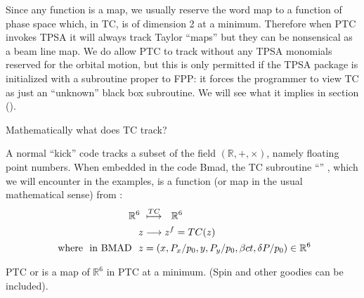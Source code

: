 \documentclass{hitec}     %
\begin{document}
Since any function is a map, we usually reserve the word map to a function of phase space which, in TC, is of dimension 2 at a minimum. Therefore when PTC invokes TPSA it will always track Taylor ``maps'' but they can be nonsensical as a beam line map. We do  allow PTC  to track without any TPSA monomials reserved for the orbital motion, but this is only  permitted if the TPSA package is initialized with a subroutine proper to FPP: it forces the programmer to view TC as  just  an ``unknown'' black box subroutine. We will see what it implies  in section ().


Mathematically what does TC track?

A normal ``kick'' code tracks a subset of the field $(\mathbb{R},+,\times)$, namely floating point numbers. When embedded in the code Bmad, the TC subroutine ``'' , which we will encounter in the examples, is a function (or map in the usual mathematical sense) from :
%
\begin{align} {{\mathbb{R}}}^{6}\ &\stackrel{TC}{\longmapsto}\ \ {{\mathbb{R}}}^{6} \\  z &\longrightarrow {z}^{f}=TC(z) \\~{\rm w}{\rm h}{\rm e}{\rm r}{\rm e}~~{\rm i}{\rm n}~{\rm B}{\rm M}{\rm A}{\rm D}~~z&=
\left({x,{P}_{x}/{p}_{0},y,{P}_{y}/{p}_{0},\beta ct,\delta P/{p}_{0}}\right)\in {{\mathbb{R}}}^{6}\end{align}


PTC or   is a map of  ${{\mathbb{R}}}^{6}$ in PTC at a minimum. (Spin and other goodies can be included).
\end{document}
